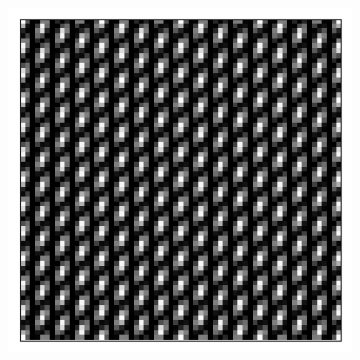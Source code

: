 \begin{figure}[h]
\begin{subfigure}[t]{0.3\textwidth}
		\caption{}
		\label{fig:fringes_2}
	\end{subfigure}
	\begin{subfigure}[t]{0.3\textwidth}
		\centering
		\includegraphics[width=\linewidth]{images/fringes_moire_kx_16_and_12_ky_0_and_12.png}
		\caption{}
		\label{fig:fringes_moire}
	\end{subfigure}


\end{figure}
